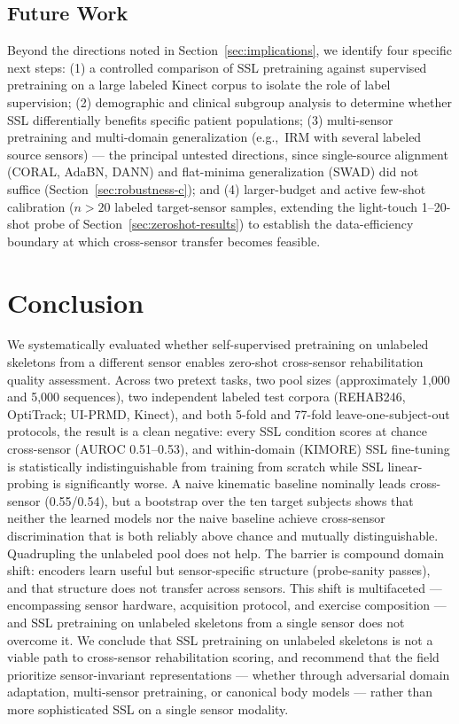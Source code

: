 \documentclass[10pt,journal]{IEEEtran}
\begin{document}
\subsection{Future Work}
\label{sec:future}

Beyond the directions noted in Section~\ref{sec:implications}, we identify four specific next steps: (1) a controlled comparison of SSL pretraining against supervised pretraining on a large labeled Kinect corpus to isolate the role of label supervision; (2) demographic and clinical subgroup analysis to determine whether SSL differentially benefits specific patient populations; (3) multi-sensor pretraining and multi-domain generalization (e.g.,\ IRM \cite{arjovsky2019irm} with several labeled source sensors) --- the principal untested directions, since single-source alignment (CORAL, AdaBN, DANN) and flat-minima generalization (SWAD) did not suffice (Section~\ref{sec:robustness-c}); and (4) larger-budget and active few-shot calibration ($n > 20$ labeled target-sensor samples, extending the light-touch 1--20-shot probe of Section~\ref{sec:zeroshot-results}) to establish the data-efficiency boundary at which cross-sensor transfer becomes feasible.

\section{Conclusion}
\label{sec:conclusion}

We systematically evaluated whether self-supervised pretraining on unlabeled skeletons from a different sensor enables zero-shot cross-sensor rehabilitation quality assessment. Across two pretext tasks, two pool sizes (approximately 1,000 and 5,000 sequences), two independent labeled test corpora (REHAB246, OptiTrack; UI-PRMD, Kinect), and both 5-fold and 77-fold leave-one-subject-out protocols, the result is a clean negative: every SSL condition scores at chance cross-sensor (AUROC 0.51--0.53), and within-domain (KIMORE) SSL fine-tuning is statistically indistinguishable from training from scratch while SSL linear-probing is significantly worse. A naive kinematic baseline nominally leads cross-sensor (0.55/0.54), but a bootstrap over the ten target subjects shows that neither the learned models nor the naive baseline achieve cross-sensor discrimination that is both reliably above chance and mutually distinguishable. Quadrupling the unlabeled pool does not help. The barrier is compound domain shift: encoders learn useful but sensor-specific structure (probe-sanity passes), and that structure does not transfer across sensors. This shift is multifaceted --- encompassing sensor hardware, acquisition protocol, and exercise composition --- and SSL pretraining on unlabeled skeletons from a single sensor does not overcome it. We conclude that SSL pretraining on unlabeled skeletons is not a viable path to cross-sensor rehabilitation scoring, and recommend that the field prioritize sensor-invariant representations --- whether through adversarial domain adaptation, multi-sensor pretraining, or canonical body models --- rather than more sophisticated SSL on a single sensor modality.
\end{document}
